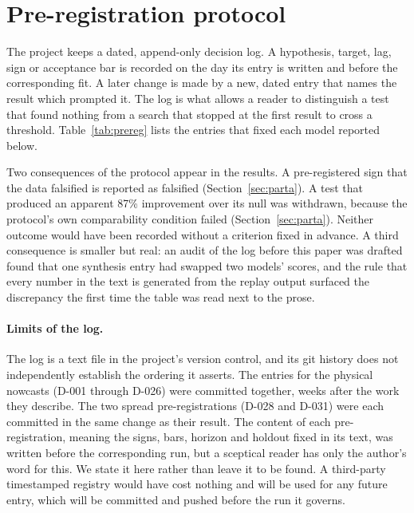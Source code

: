 \section{Pre-registration protocol}\label{sec:prereg}

The project keeps a dated, append-only decision log. A hypothesis, target, lag, sign
or acceptance bar is recorded on the day its entry is written and before the
corresponding fit. A later change is made by a new, dated entry that names the
result which prompted it. The log is what allows a reader to distinguish a test that
found nothing from a search that stopped at the first result to cross a threshold.
Table~\ref{tab:prereg} lists the entries that fixed each model reported below.

\begin{table}[tb]
\centering\small
\caption{Pre-registration entries. The commit column is discussed in the text.}
\label{tab:prereg}

\end{table}

Two consequences of the protocol appear in the results. A pre-registered sign that
the data falsified is reported as falsified (Section~\ref{sec:parta}). A test that
produced an apparent 87\% improvement over its null was withdrawn, because the
protocol's own comparability condition failed (Section~\ref{sec:parta}). Neither
outcome would have been recorded without a criterion fixed in advance. A third
consequence is smaller but real: an audit of the log before this paper was drafted
found that one synthesis entry had swapped two models' scores, and the rule that
every number in the text is generated from the replay output surfaced the
discrepancy the first time the table was read next to the prose.

\paragraph{Limits of the log.} The log is a text file in the project's version
control, and its git history does not independently establish the ordering it
asserts. The entries for the physical nowcasts (D-001 through D-026) were committed
together, weeks after the work they describe. The two spread pre-registrations
(D-028 and D-031) were each committed in the same change as their result. The
content of each pre-registration, meaning the signs, bars, horizon and holdout fixed
in its text, was written before the corresponding run, but a sceptical reader has
only the author's word for this. We state it here rather than leave it to be found.
A third-party timestamped registry would have cost nothing and will be used for any
future entry, which will be committed and pushed before the run it governs.
